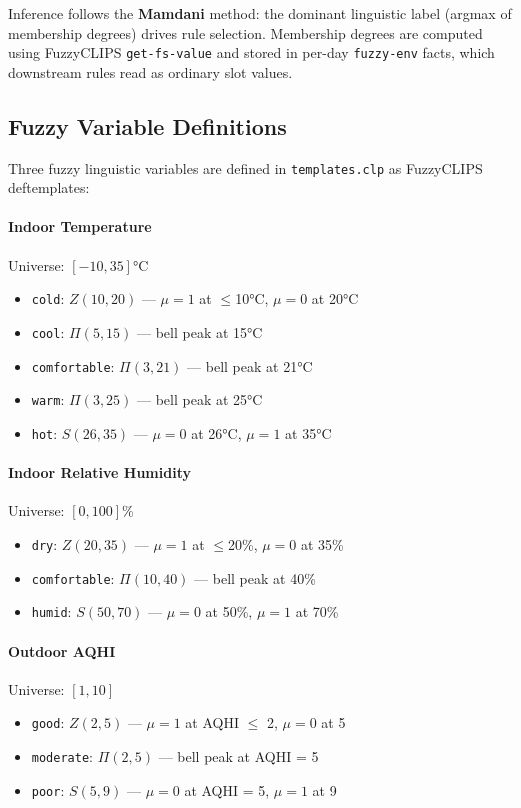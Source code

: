 \documentclass{article}
\begin{document}
Inference follows the \textbf{Mamdani} method: the dominant linguistic label (argmax of membership degrees) drives rule selection. Membership degrees are computed using FuzzyCLIPS \texttt{get-fs-value} and stored in per-day \texttt{fuzzy-env} facts, which downstream rules read as ordinary slot values.

\subsection{Fuzzy Variable Definitions}

Three fuzzy linguistic variables are defined in \texttt{templates.clp} as FuzzyCLIPS deftemplates:

\paragraph{Indoor Temperature} Universe: $[-10, 35]$°C
\begin{itemize}
    \item \texttt{cold}: $Z(10, 20)$ — $\mu=1$ at $\leq$10°C, $\mu=0$ at 20°C
    \item \texttt{cool}: $\Pi(5, 15)$ — bell peak at 15°C
    \item \texttt{comfortable}: $\Pi(3, 21)$ — bell peak at 21°C
    \item \texttt{warm}: $\Pi(3, 25)$ — bell peak at 25°C
    \item \texttt{hot}: $S(26, 35)$ — $\mu=0$ at 26°C, $\mu=1$ at 35°C
\end{itemize}

\paragraph{Indoor Relative Humidity} Universe: $[0, 100]$\%
\begin{itemize}
    \item \texttt{dry}: $Z(20, 35)$ — $\mu=1$ at $\leq$20\%, $\mu=0$ at 35\%
    \item \texttt{comfortable}: $\Pi(10, 40)$ — bell peak at 40\%
    \item \texttt{humid}: $S(50, 70)$ — $\mu=0$ at 50\%, $\mu=1$ at 70\%
\end{itemize}

\paragraph{Outdoor AQHI} Universe: $[1, 10]$
\begin{itemize}
    \item \texttt{good}: $Z(2, 5)$ — $\mu=1$ at AQHI $\leq$ 2, $\mu=0$ at 5
    \item \texttt{moderate}: $\Pi(2, 5)$ — bell peak at AQHI = 5
    \item \texttt{poor}: $S(5, 9)$ — $\mu=0$ at AQHI = 5, $\mu=1$ at 9
\end{itemize}
\end{document}
